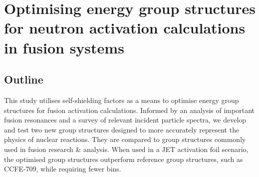 \chapter{Optimising energy group structures for neutron activation calculations in fusion systems}
\label{chap:group_structure}

\ifpdf
    \graphicspath{{Chapter3/Figs/Raster/}{Chapter3/Figs/PDF/}{Chapter3/Figs/}}
\else
    \graphicspath{{Chapter3/Figs/Vector/}{Chapter3/Figs/}}
\fi


\section{Outline}
\label{sec:outline}

This study utilises self-shielding factors as a means to optimise energy group structures for fusion activation calculations. Informed by an analysis of important fusion resonances and a survey of relevant incident particle spectra, we develop and test two new group structures designed to more accurately represent the physics of nuclear reactions. They are compared to group structures commonly used in fusion research \& analysis. When used in a JET activation foil scenario, the optimised group structures outperform reference group structures, such as CCFE-709, while requiring fewer bins.

